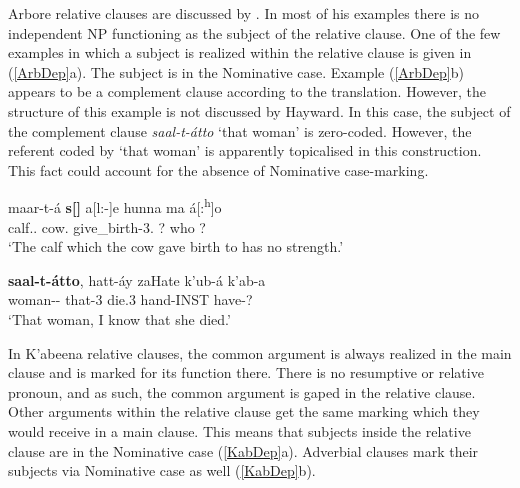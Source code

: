 Arbore relative clauses are discussed by \citet[314]{Hayward:1984}. 
In most of his examples there is no independent NP functioning as the subject of the relative clause. 
One of the few examples in which a subject is realized within the relative clause is given in (\ref{ArbDep}a). 
The subject is in the Nominative  case. 
Example (\ref{ArbDep}b) appears to be a complement clause according to the translation. 
However, the structure of this example is not discussed by Hayward. 
In this case, the subject of the complement clause \emph{saal-t-\'atto} `that woman' is zero-coded. 
However, the referent coded by `that woman' is apparently topicalised in this construction. 
This fact could account for the absence of Nominative case-marking.

\begin{exe}\ex\label{ArbDep}
\begin{xlist}
\ex\gll maar-t-\'a \textbf{s[\textglotstop{}]} a[l:-]e hunna ma \'a[:\textsuperscript{h}]o\\
calf.\fem{}.\nom{} cow.\nom{} give\_birth-3\sg{}.\pfv{} ? who ? \\
\glt`The calf which the cow gave birth to has no strength.'

\ex\gll \textbf{saal-t-\'atto}, hatt-\'ay zaHate k'ub-\'a k'ab-a\\
woman-\fem{}-\dist{} that-3\sg{} die.3\sg{} hand-INST have-? \\
\glt`That woman, I know that she died.' %
\end{xlist}
\end{exe}	

In K'abeena relative clauses, the common argument is always realized in the main clause and is marked for its function there.  
There is no resumptive or relative pronoun, and as such, the common argument is gaped in the  relative clause. 
Other arguments within the relative clause get the same marking which they would receive in a main clause.
This means that subjects inside the relative clause are in the Nominative  case (\ref{KabDep}a).
Adverbial clauses mark their subjects via Nominative  case as well (\ref{KabDep}b).

